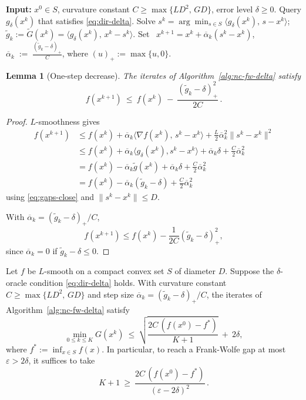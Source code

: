 \documentclass[smallextended]{svjour3}
\newtheorem{lem}[theorem]{Lemma}
\begin{document}
\begin{algorithm}[H]
\caption{Nonconvex Frank-Wolfe with a $\delta$-oracle}\label{alg:nc-fw-delta}
\begin{algorithmic}[1]
\State \textbf{Input:} $x^0\in S$, curvature constant $C\ge \max\{L D^2,\,G D\}$, error level $\delta\ge0$.
  \State Query $g_\delta(x^k)$ that satisfies \eqref{eq:dir-delta}.
  \State Solve $s^k=\arg\min_{s\in S}\langle g_\delta(x^k),\,s-x^k\rangle$; $\tilde g_k:=\tilde G(x^k)=\langle g_\delta(x^k),\,x^k-s^k\rangle$.
  \State Set \ $x^{k+1}= x^k+\overline{\alpha}_k(s^k-x^k)$, $\overline{\alpha}_k\;:=\;\frac{(\tilde g_k-\delta)_+}{C}$, where $(u)_+:=\max\{u,0\}$.
\EndFor
\end{algorithmic}
\end{algorithm}

\begin{lem}[One-step decrease]\label{lem:nc-one-step}
The iterates of Algorithm~\ref{alg:nc-fw-delta} satisfy
\begin{equation}\label{eq:nc-descent}
f(x^{k+1})\ \le\ f(x^k)\ -\ \frac{(\tilde g_k-\delta)_+^2}{2C}\, .
\end{equation}
\end{lem}

\begin{proof}
$L$-smoothness gives
\[
\begin{aligned}
f(x^{k+1})&\le f(x^k)+\overline{\alpha}_k\langle \nabla f(x^k),\,s^k-x^k\rangle+\tfrac{L}{2}\overline{\alpha}_k^2\|s^k-x^k\|^2\\
&\le f(x^k) + \overline{\alpha}_k\langle g_{\delta}(x^k), s^k - x^k\rangle + \overline{\alpha}_k \delta + \frac{C}{2}\overline{\alpha}_k^2\\
&= f(x^k) - \overline{\alpha}_k \tilde{g}(x^k) + \overline{\alpha}_k \delta + \frac{C}{2} \overline{\alpha}_k^2\\
&= f(x^k) - \overline{\alpha}_k (\tilde{g}_k - \delta) + \frac{C}{2} \overline{\alpha}_k^2
\end{aligned}
\]
using \eqref{eq:gaps-close} and $\|s^k-x^k\|\le D$.

With $\overline{\alpha}_k=(\tilde g_k-\delta)_+/C$, 
\[f(x^{k + 1}) \leq f(x^k) - \frac{1}{2C}(\tilde g_k-\delta)_+^2,\]
since $\overline{\alpha}_k = 0$ if $\tilde g_k-\delta \leq 0$.
\end{proof}

\begin{theorem}\label{thm:nc-delta}
Let $f$ be $L$-smooth on a compact convex set $S$ of diameter $D$. Suppose the $\delta$-oracle condition \eqref{eq:dir-delta} holds. With curvature constant $C\ge\max\{L D^2,\,G D\}$ and step size $\overline{\alpha}_k=(\tilde g_k-\delta)_+/C$, the iterates of Algorithm~\ref{alg:nc-fw-delta} satisfy
\begin{equation}\label{eq:nc-rate}
\min_{0\le k\le K} G(x^k)\ \le\ \sqrt{\frac{2C\,(f(x^0)-f^*)}{K+1}}\ +\ 2\delta,
\end{equation}
where $f^*:=\inf_{x\in S} f(x)$. In particular, to reach a Frank-Wolfe gap at most $\varepsilon>2\delta$, it suffices to take
\[
K+1\ \ge\ \frac{2C\,(f(x^0)-f^*)}{(\varepsilon-2\delta)^2}\, .
\]
\end{theorem}\medskip
\end{document}
